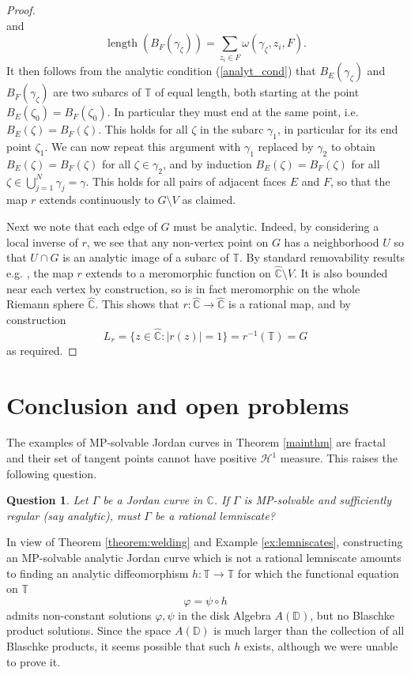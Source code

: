 \documentclass{amsart}
\theoremstyle{plain}
\newtheorem{question}[theorem]{Question}
\theoremstyle{definition}
\theoremstyle{remark}
\newcommand{\mC}{\mathbb{C}}
\newcommand{\mD}{\mathbb{D}}
\newcommand{\mT}{\mathbb{T}}
\newcommand{\hC}{\widehat{\mathbb{C}}}
\begin{document}
\begin{proof}
$$$$
and
$$
\operatorname{length}(B_F(\gamma_\zeta))=\sum_{z_i \in F} \omega(\gamma_\zeta, z_i, F).
$$
It then follows from the analytic condition (\ref{analyt_cond}) that $B_E(\gamma_\zeta)$ and $B_F(\gamma_\zeta)$ are two subarcs of $\mT$ of equal length, both starting at the point $B_E(\zeta_0)=B_F(\zeta_0)$. In particular they must end at the same point, i.e. $B_E(\zeta)=B_F(\zeta)$. This holds for all $\zeta$ in the subarc $\gamma_1$, in particular for its end point $\zeta_1$. We can now repeat this argument with $\gamma_1$ replaced by $\gamma_2$ to obtain $B_E(\zeta)=B_F(\zeta)$ for all $\zeta \in \gamma_2$, and by induction $B_E(\zeta)=B_F(\zeta)$ for all $\zeta \in \bigcup_{j=1}^N \gamma_j = \gamma$. This holds for all pairs of adjacent faces $E$ and $F$, so that the map $r$ extends continuously to $G \setminus V$ as claimed.

Next we note that each edge of $G$ must be analytic. Indeed, by considering a local inverse of $r$, we see that any non-vertex point on $G$ has a neighborhood $U$ so that $U \cap G$ is an analytic image of a subarc of $\mT$. By standard removability results e.g. \cite[Theorem 10.48]{Zakeri2021}, the map $r$ extends to a meromorphic function on $\hC \setminus V$. It is also bounded near each vertex by construction, so is in fact meromorphic on the whole Riemann sphere $\hC$. This shows that $r:\hC \to \hC$ is a rational map, and by construction
$$L_r = \{z \in \hC: |r(z)|=1\} = r^{-1}(\mT) = G$$
as required.
\end{proof}





\section{Conclusion and open problems}
\label{sec7}

The examples of MP-solvable Jordan curves in Theorem \ref{mainthm} are fractal and their set of tangent points cannot have positive $\mathcal{H}^1$ measure. This raises the following question.

\begin{question}
Let $\Gamma$ be a Jordan curve in $\mC$. If $\Gamma$ is MP-solvable and sufficiently regular (say analytic), must $\Gamma$ be a rational lemniscate?
\end{question}

In view of Theorem \ref{theorem:welding} and Example \ref{ex:lemniscates}, constructing an MP-solvable analytic Jordan curve which is not a rational lemniscate amounts to finding an analytic diffeomorphism $h:\mT \to \mT$ for which the functional equation on $\mT$
$$
\varphi = \psi \circ h
$$
admits non-constant solutions $\varphi,\psi$ in the disk Algebra $A(\mD)$, but no Blaschke product solutions. Since the space $A(\mD)$ is much larger than the collection of all Blaschke products, it seems possible that such $h$ exists, although we were unable to prove it.
\\
\end{document}
